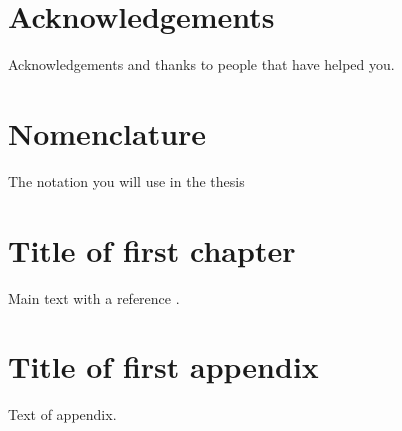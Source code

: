 \documentclass[english,bachelor]{liumaiex}
\begin{document}
\chapter*{Acknowledgements}

Acknowledgements and thanks to people that have helped you.

\chapter*{Nomenclature}

The notation you will use in the thesis

\tableofcontents




%
%
\mainmatter

\chapter{Title of first chapter}

Main text with a reference \cite{grote:97}.

%
%

 


%
%
\appendix

\chapter{Title of first appendix}

Text of appendix.
\end{document}
